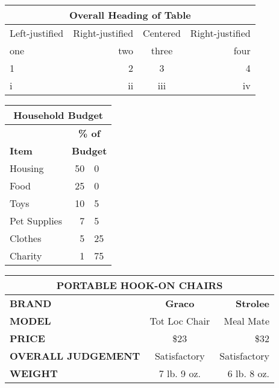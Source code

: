 \documentclass{article}
\begin{document}
\begin{center}
\begin{tabular}{|l|r|c|r|}
\hline
\multicolumn{4}{|c|}{\textbf{Overall Heading of Table}} \\ \hline
\multicolumn{1}{|c|}{Left-justified} & \multicolumn{1}{c|}{Right-justified}
& Centered & \multicolumn{1}{|c|}{Right-justified} \\ \hline\hline
one & two & three & four \\ \cline{2-4}
1 & 2 & 3 & 4 \\ 
i & ii & iii & iv \\ \hline
\end{tabular}

\begin{tabular}{|l|r@{.}l|}
\hline
\multicolumn{3}{|c|}{\textbf{Household Budget}} \\ \hline\hline
& \multicolumn{2}{c|}{\textbf{\% of}} \\ 
\textbf{Item} & \multicolumn{2}{c|}{\textbf{Budget}} \\ \hline
Housing & 50 & 0 \\ 
Food & 25 & 0 \\ 
Toys & 10 & 5 \\ 
Pet Supplies & 7 & 5 \\ 
Clothes & 5 & 25 \\ 
Charity & 1 & 75 \\ \hline
\end{tabular}

\begin{tabular}{|l|cr|}
\hline
\multicolumn{3}{|c|}{\textbf{PORTABLE HOOK-ON CHAIRS}} \\ \hline\hline
\textbf{BRAND} & \textbf{Graco} & \textbf{Strolee} \\ \hline
\textbf{MODEL} & Tot Loc Chair & Meal Mate \\ \hline
\textbf{PRICE} & \$23 & \$32 \\ \hline
\textbf{OVERALL JUDGEMENT} & Satisfactory & Satisfactory \\ \hline
\textbf{WEIGHT} & 7 lb. 9 oz. & 6 lb. 8 oz. \\ \hline
\end{tabular}


\end{center}
\end{document}
